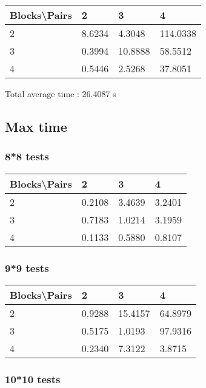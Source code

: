 \documentclass[12pt, a4paper]{article}
\begin{document}
				\begin{tabular}[h]{|l|l|l|l|}
				\hline
				Blocks\textbackslash Pairs & 2 & 3 & 4 \\
				\hline
				2 & 8.6234 & 4.3048 & 114.0338 \\
				\hline
				3 & 0.3994 & 10.8888 & 58.5512 \\
				\hline
				4 & 0.5446 & 2.5268 & 37.8051 \\
				\hline
				\end{tabular}

				Total average time : 26.4087 s

		\subsection{Max time}

			\subsubsection{8*8 tests}

				\begin{tabular}[h]{|l|l|l|l|}
				\hline
				Blocks\textbackslash Pairs & 2 & 3 & 4 \\
				\hline
				2 & 0.2108 & 3.4639 & 3.2401 \\
				\hline
				3 & 0.7183 & 1.0214 & 3.1959 \\
				\hline
				4 & 0.1133 & 0.5880 & 0.8107 \\
				\hline
				\end{tabular}

			\subsubsection{9*9 tests}

				\begin{tabular}[h]{|l|l|l|l|}
				\hline
				Blocks\textbackslash Pairs & 2 & 3 & 4 \\
				\hline
				2 & 0.9288 & 15.4157 & 64.8979 \\
				\hline
				3 & 0.5175 & 1.0193 & 97.9316 \\
				\hline
				4 & 0.2340 & 7.3122 & 3.8715 \\
				\hline
				\end{tabular}

			\subsubsection{10*10 tests}
\end{document}
